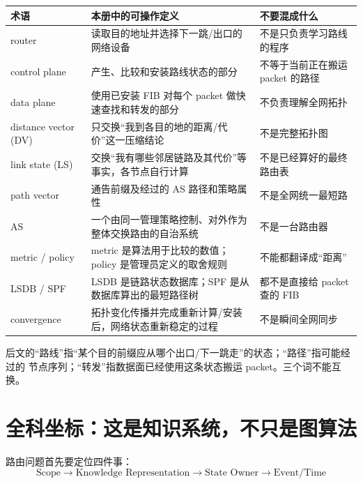\documentclass[11pt,a4paper]{ctexart}
\begin{document}
\begin{center}
\small
\begin{tabularx}{\linewidth}{L{2.5cm}L{4.1cm}Y}
\toprule
术语 & 本册中的可操作定义 & 不要混成什么 \\
\midrule
router & 读取目的地址并选择下一跳/出口的网络设备 & 不是只负责学习路线的程序 \\
control plane & 产生、比较和安装路线状态的部分 & 不等于当前正在搬运 packet 的路径 \\
data plane & 使用已安装 FIB 对每个 packet 做快速查找和转发的部分 & 不负责理解全网拓扑 \\
distance vector (DV) & 只交换“我到各目的地的距离/代价”这一压缩结论 & 不是完整拓扑图 \\
link state (LS) & 交换“我有哪些邻居链路及其代价”等事实，各节点自行计算 & 不是已经算好的最终路由表 \\
path vector & 通告前缀及经过的 AS 路径和策略属性 & 不是全网统一最短路 \\
AS & 一个由同一管理策略控制、对外作为整体交换路由的自治系统 & 不是一台路由器 \\
metric / policy & metric 是算法用于比较的数值；policy 是管理员定义的取舍规则 & 不能都翻译成“距离” \\
LSDB / SPF & LSDB 是链路状态数据库；SPF 是从数据库算出的最短路径树 & 都不是直接给 packet 查的 FIB \\
convergence & 拓扑变化传播并完成重新计算/安装后，网络状态重新稳定的过程 & 不是瞬间全网同步 \\
\bottomrule
\end{tabularx}
\end{center}

后文的“路线”指“某个目的前缀应从哪个出口/下一跳走”的状态；“路径”指可能经过的
节点序列；“转发”指数据面已经使用这条状态搬运 packet。三个词不能互换。

\tableofcontents
\newpage

\section{全科坐标：这是知识系统，不只是图算法}

路由问题首先要定位四件事：
\[
\boxed{\text{Scope}\to\text{Knowledge Representation}\to\text{State Owner}\to\text{Event/Time}}
\]
\end{document}
